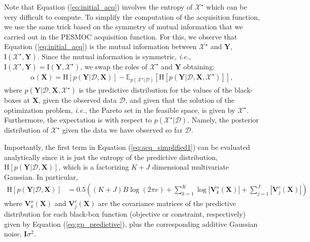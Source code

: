 Note that Equation (\ref{eq:initial_acq}) involves the entropy of $\mathcal{X}^\star$ which can be very difficult 
to compute.  To simplify the computation of the acquisition function, we use the same trick
based on the symmetry of mutual information that we carried out in the PESMOC acquisition function. For this, we observe that Equation (\ref{eq:initial_acq}) is the mutual information between $\mathcal{X}^\star$ and $\mathbf{Y}$,
$\text{I}(\mathcal{X}^\star,\mathbf{Y})$. Since the mutual information is symmetric, 
\emph{i.e.}, $\text{I}(\mathcal{X}^\star,\mathbf{Y})=\text{I}(\mathbf{Y},\mathcal{X}^\star)$,
we swap the roles of $\mathcal{X}^\star$ and $\mathbf{Y}$ obtaining:
\begin{align}
\alpha(\mathbf{X}) = \text{H}[p(\mathbf{Y}|\mathcal{D},\mathbf{X})] - 
	\mathbb{E}_{p(\mathcal{X}^\star|\mathcal{D})}[\text{H}[p(\mathbf{Y}|\mathcal{D},\mathbf{X},\mathcal{X}^\star)]],
\label{eq:acq_simplified1}
\end{align}
where $p(\mathbf{Y}|\mathcal{D},\mathbf{X},\mathcal{X}^\star)$ is the predictive distribution for 
the values of the black-boxes at $\mathbf{X}$, given the observed data $\mathcal{D}$, 
and given that the solution of the optimization problem, \emph{i.e.}, the Pareto set in the 
feasible space, is given by $\mathcal{X}^\star$. Furthermore, the expectation is with respect to
$p(\mathcal{X}^\star|\mathcal{D})$. Namely, the posterior distribution of $\mathcal{X}^\star$
given the data we have observed so far $\mathcal{D}$.

Importantly, the first term in Equation (\ref{eq:acq_simplified1}) can be evaluated analytically since it is just 
the entropy of the predictive distribution, $\text{H}[p(\mathbf{Y}|\mathcal{D},\mathbf{X})]$, 
which is a factorizing $K+J$ dimensional multivariate Gaussian. In particular,
\begin{align}
\text{H}[p(\mathbf{Y}|\mathcal{D},\mathbf{X})] 
 & = 0.5 ((K+J)B\log(2\pi e)+\sum_{k=1}^{K} \log|\mathbf{V}_k^o(\mathbf{X})| + \sum_{j=1}^{J}|\mathbf{V}_j^c(\mathbf{X})| )
\end{align}
where $\mathbf{V}_k^o(\mathbf{X})$ and $\mathbf{V}_j^c(\mathbf{X})$ are the covariance matrices of the predictive
distribution for each black-box function (objective or constraint, respectively) given by Equation (\ref{eq:gp_predictive}),
plus the corresponding additive Gaussian noise, $\mathbf{I}\sigma^2$.

